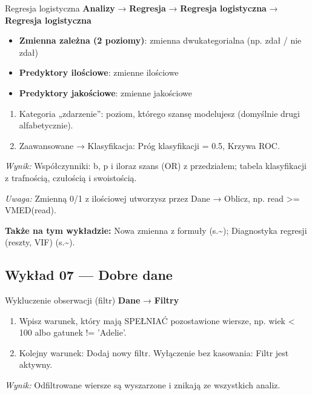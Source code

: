 \documentclass[
  polish,
  10pt,
  a4paper,
  DIV=11,
  numbers=noendperiod]{scrartcl}
\newcommand{\jmenu}[1]{{\color{upwraccent}\small #1}}
\begin{document}
\begin{jbox}{Regresja logistyczna}\label{w:logistyczna}
\jmenu{\textbf{Analizy} → \textbf{Regresja} → \textbf{Regresja logistyczna} → \textbf{Regresja logistyczna}}

\begin{itemize}
\item[$\triangleright$] \textbf{Zmienna zależna (2 poziomy)}: zmienna dwukategorialna (np. zdał / nie zdał)
\item[$\triangleright$] \textbf{Predyktory ilościowe}: zmienne ilościowe
\item[$\triangleright$] \textbf{Predyktory jakościowe}: zmienne jakościowe
\end{itemize}
\begin{enumerate}
\item Kategoria „zdarzenie”: poziom, którego szansę modelujesz (domyślnie drugi alfabetycznie).
\item Zaawansowane → Klasyfikacja: Próg klasyfikacji = 0.5, Krzywa ROC.
\end{enumerate}
\textit{Wynik:} Współczynniki: b, p i iloraz szans (OR) z przedziałem; tabela klasyfikacji z trafnością, czułością i swoistością.

{\color{upwrsoft}\small\textit{Uwaga:} Zmienną 0/1 z ilościowej utworzysz przez Dane → Oblicz, np. read \textgreater{}= VMED(read).}
\end{jbox}

\textbf{Także na tym wykładzie:} Nowa zmienna z formuły
(s.\textasciitilde{}\pageref{w:oblicz-zmienna}); Diagnostyka regresji
(reszty, VIF) (s.\textasciitilde{}\pageref{w:jakosc-modelu}).


\subsection{Wykład 07 --- Dobre dane}\label{wykux142ad-07-dobre-dane}

\begin{jbox}{Wykluczenie obserwacji (filtr)}\label{w:filtry}
\jmenu{\textbf{Dane} → \textbf{Filtry}}

\begin{enumerate}
\item Wpisz warunek, który mają SPEŁNIAĆ pozostawione wiersze, np. wiek \textless{} 100 albo gatunek != 'Adelie'.
\item Kolejny warunek: Dodaj nowy filtr. Wyłączenie bez kasowania: Filtr jest aktywny.
\end{enumerate}
\textit{Wynik:} Odfiltrowane wiersze są wyszarzone i znikają ze wszystkich analiz.

\end{jbox}
\end{document}
